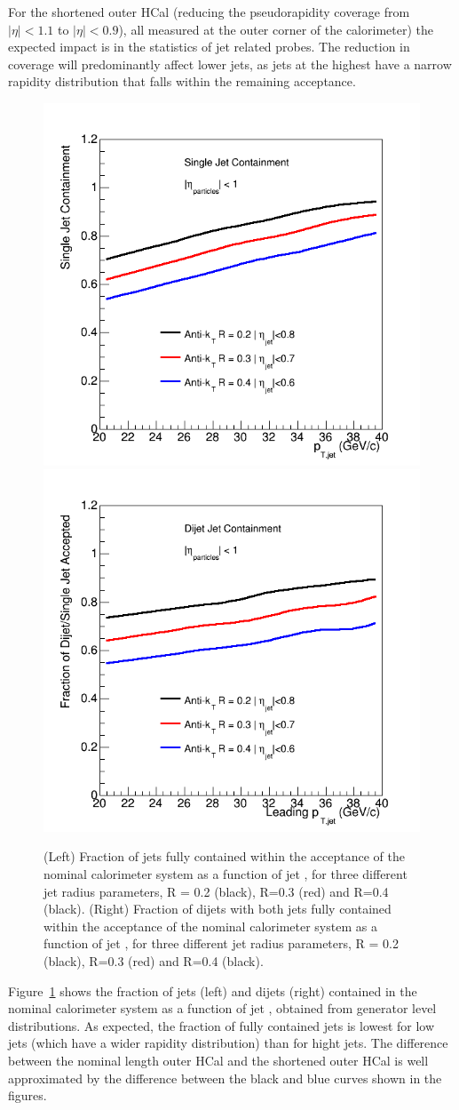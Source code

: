 For the shortened outer HCal (reducing the pseudorapidity coverage
from $|\eta| < 1.1$ to $|\eta| < 0.9$), all measured at the outer
corner of the calorimeter) the expected impact is in the statistics of
jet related probes. The reduction in coverage will predominantly
affect lower \pt jets, as jets at the highest \pT have a narrow
rapidity distribution that falls within the remaining acceptance.
\begin{figure}[hbt]
  \centering
  \includegraphics[width=0.4\linewidth]{figs/SingleJet_eta_reference}
  \hspace{0.1\linewidth}
  \includegraphics[width=0.4\linewidth]{figs/Dijet_eta_reference}
  \caption{(Left) 
  Fraction of jets fully contained within the acceptance of the nominal calorimeter system as a function
  of jet \pt, for three different jet radius parameters, R = 0.2 (black), R=0.3 (red) and R=0.4 (black). 
   (Right) 
  Fraction of dijets with both jets fully contained within the acceptance of the nominal calorimeter system as a function
  of jet \pt, for three different jet radius parameters, R = 0.2 (black), R=0.3 (red) and R=0.4 (black).}
  \label{fig:jet_containment_nominal}
\end{figure}
Figure~\ref{fig:jet_containment_nominal} shows the fraction of jets (left) and dijets (right) contained in the nominal calorimeter 
system as a function of jet \pt, obtained from generator level distributions. As expected, the fraction of fully contained jets is lowest for low \pT jets (which have a wider
rapidity distribution) than for hight \pt jets. The difference between the nominal length outer HCal and the shortened outer HCal
is well approximated by the difference between the black and blue curves shown in the figures.

